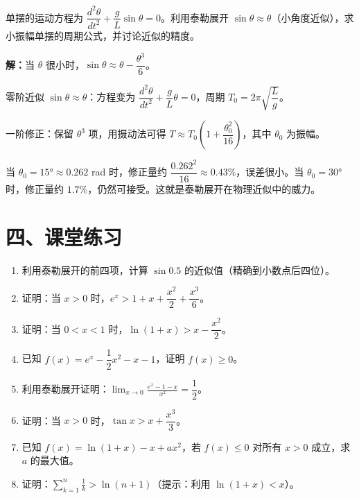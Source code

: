 \documentclass[12pt, a4paper]{ctexart}
\begin{document}
\begin{appbox}[【应用3】物理中的小角度近似]
单摆的运动方程为 $\dfrac{d^2\theta}{dt^2} + \dfrac{g}{L}\sin\theta = 0$。利用泰勒展开 $\sin\theta \approx \theta$（小角度近似），求小振幅单摆的周期公式，并讨论近似的精度。
\end{appbox}

\textbf{解：}当 $\theta$ 很小时，$\sin\theta \approx \theta - \dfrac{\theta^3}{6}$。

零阶近似 $\sin\theta \approx \theta$：方程变为 $\dfrac{d^2\theta}{dt^2} + \dfrac{g}{L}\theta = 0$，周期 $T_0 = 2\pi\sqrt{\dfrac{L}{g}}$。

一阶修正：保留 $\theta^3$ 项，用摄动法可得 $T \approx T_0\left(1 + \dfrac{\theta_0^2}{16}\right)$，其中 $\theta_0$ 为振幅。

当 $\theta_0 = 15°\approx 0.262$ rad 时，修正量约 $\dfrac{0.262^2}{16} \approx 0.43\%$，误差很小。当 $\theta_0 = 30°$ 时，修正量约 $1.7\%$，仍然可接受。这就是泰勒展开在物理近似中的威力。

\section*{\textcolor{tipgreen}{四、课堂练习}}

\begin{enumerate}[leftmargin=2em]
  \item 利用泰勒展开的前四项，计算 $\sin 0.5$ 的近似值（精确到小数点后四位）。

  \item 证明：当 $x > 0$ 时，$e^x > 1 + x + \dfrac{x^2}{2} + \dfrac{x^3}{6}$。

  \item 证明：当 $0 < x < 1$ 时，$\ln(1+x) > x - \dfrac{x^2}{2}$。

  \item 已知 $f(x) = e^x - \dfrac{1}{2}x^2 - x - 1$，证明 $f(x) \geq 0$。

  \item 利用泰勒展开证明：$\displaystyle\lim_{x \to 0} \frac{e^x - 1 - x}{x^2} = \dfrac{1}{2}$。

  \item 证明：当 $x > 0$ 时，$\tan x > x + \dfrac{x^3}{3}$。

  \item 已知 $f(x) = \ln(1+x) - x + ax^2$，若 $f(x) \leq 0$ 对所有 $x > 0$ 成立，求 $a$ 的最大值。

  \item 证明：$\displaystyle\sum_{k=1}^{n} \frac{1}{k} > \ln(n+1)$（提示：利用 $\ln(1+x) < x$）。
\end{enumerate}
\end{document}
